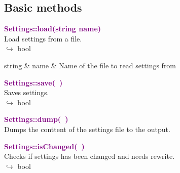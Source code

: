 
\subsection{Basic methods}

\textcolor{purple}{\textbf{Settings::load(string name)}}\label{Settings::load(string name)}\\
Load settings from a file.\\ \hspace*{10mm}$\hookrightarrow$ bool

\begin{tcolorbox}[width=\textwidth,myArgs,tabularx={ll|R}]
string & name & Name of the file to read settings from
\end{tcolorbox}


\textcolor{purple}{\textbf{Settings::save(~)}}\label{Settings::save()}\\
Saves settings.\\ \hspace*{10mm}$\hookrightarrow$ bool


\textcolor{purple}{\textbf{Settings::dump(~)}}\label{Settings::dump()}\\
Dumps the conttent of the settings file to the output.


\textcolor{purple}{\textbf{Settings::isChanged(~)}}\label{Settings::isChanged()}\\
Checks if settings has been changed and needs rewrite.\\ \hspace*{10mm}$\hookrightarrow$ bool

